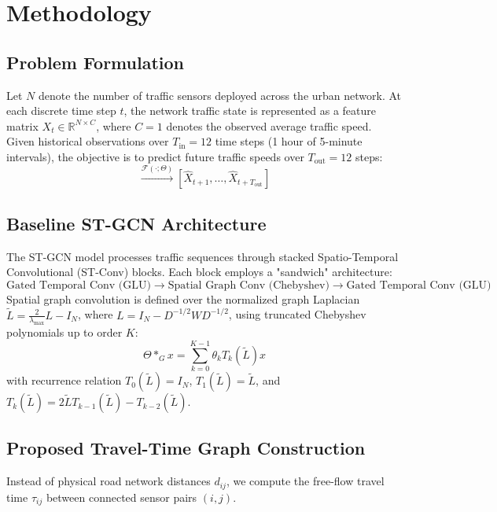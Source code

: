 \documentclass[pdflatex,sn-mathphys-num]{sn-jnl}
\theoremstyle{thmstyleone}
\theoremstyle{thmstyletwo}
\theoremstyle{thmstylethree}
\begin{document}
\section{Methodology}\label{sec:method}

\subsection{Problem Formulation}
Let $N$ denote the number of traffic sensors deployed across the urban network. At each discrete time step $t$, the network traffic state is represented as a feature matrix $X_t \in \mathbb{R}^{N \times C}$, where $C = 1$ denotes the observed average traffic speed. Given historical observations over $T_{\text{in}} = 12$ time steps (1 hour of 5-minute intervals), the objective is to predict future traffic speeds over $T_{\text{out}} = 12$ steps:
\begin{equation}
[X_{t-T_{\text{in}}+1}, \dots, X_t] \xrightarrow{\mathcal{F}(\cdot; \Theta)} [\hat{X}_{t+1}, \dots, \hat{X}_{t+T_{\text{out}}}]
\end{equation}

\subsection{Baseline ST-GCN Architecture}
The ST-GCN model processes traffic sequences through stacked Spatio-Temporal Convolutional (ST-Conv) blocks. Each block employs a "sandwich" architecture:
\begin{equation}
\text{Gated Temporal Conv (GLU)} \longrightarrow \text{Spatial Graph Conv (Chebyshev)} \longrightarrow \text{Gated Temporal Conv (GLU)}
\end{equation}
Spatial graph convolution is defined over the normalized graph Laplacian $\tilde{L} = \frac{2}{\lambda_{\max}} L - I_N$, where $L = I_N - D^{-1/2} W D^{-1/2}$, using truncated Chebyshev polynomials up to order $K$:
\begin{equation}
\Theta *_G x = \sum_{k=0}^{K-1} \theta_k T_k(\tilde{L}) x
\end{equation}
with recurrence relation $T_0(\tilde{L}) = I_N$, $T_1(\tilde{L}) = \tilde{L}$, and $T_k(\tilde{L}) = 2\tilde{L}T_{k-1}(\tilde{L}) - T_{k-2}(\tilde{L})$.

\subsection{Proposed Travel-Time Graph Construction}
Instead of physical road network distances $d_{ij}$, we compute the free-flow travel time $\tau_{ij}$ between connected sensor pairs $(i, j)$.
\end{document}
